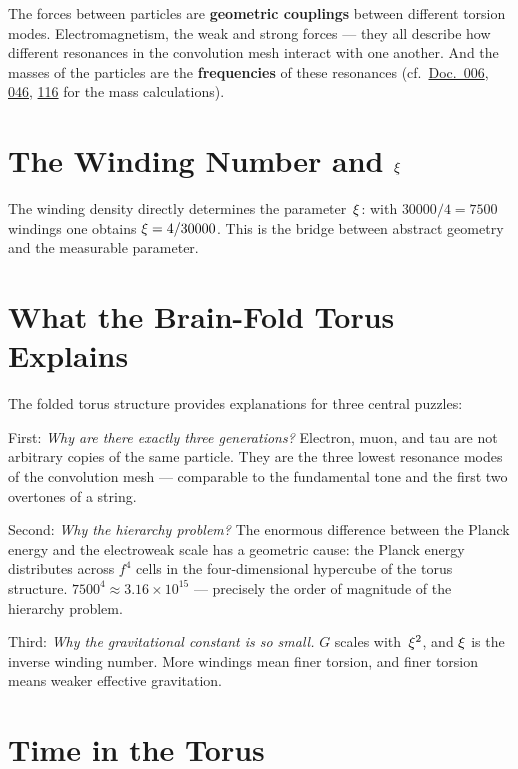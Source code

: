 The forces between particles are \textbf{geometric couplings} between different torsion modes. Electromagnetism, the weak and strong forces --- they all describe how different resonances in the convolution mesh interact with one another. And the masses of the particles are the \textbf{frequencies} of these resonances (cf.\ \href{https://github.com/jpascher/T0-Time-Mass-Duality/blob/main/2/pdf/006_T0_Teilchenmassen_De.pdf}{Doc.~006}, \href{https://github.com/jpascher/T0-Time-Mass-Duality/blob/main/2/pdf/046_Teilchenmassen_De.pdf}{046}, \href{https://github.com/jpascher/T0-Time-Mass-Duality/blob/main/2/pdf/116_T0_koide-formel-3_De.pdf}{116} for the mass calculations).

\section{The Winding Number and $\xi$}

The winding density directly determines the parameter~$\xi$: with $30000/4 = 7500$ windings one obtains $\xi = 4/30000$. This is the bridge between abstract geometry and the measurable parameter.

\section{What the Brain-Fold Torus Explains}

The folded torus structure provides explanations for three central puzzles:

First: \emph{Why are there exactly three generations?} Electron, muon, and tau are not arbitrary copies of the same particle. They are the three lowest resonance modes of the convolution mesh --- comparable to the fundamental tone and the first two overtones of a string.

Second: \emph{Why the hierarchy problem?} The enormous difference between the Planck energy and the electroweak scale has a geometric cause: the Planck energy distributes across $f^4$ cells in the four-dimensional hypercube of the torus structure. $7500^4 \approx 3.16 \times 10^{15}$ --- precisely the order of magnitude of the hierarchy problem.

Third: \emph{Why the gravitational constant is so small.} $G$ scales with~$\xi^2$, and $\xi$ is the inverse winding number. More windings mean finer torsion, and finer torsion means weaker effective gravitation.

\section{Time in the Torus}

